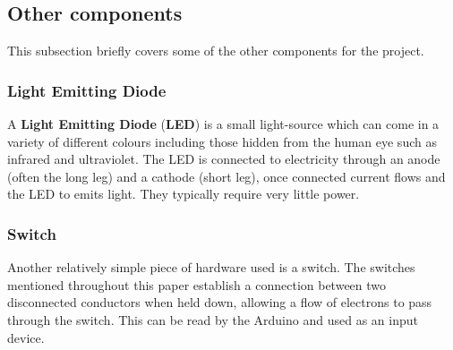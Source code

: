 \subsection{Other components}
This subsection briefly covers some of the other components for the project.
\subsubsection{Light Emitting Diode}
A \textbf{Light Emitting Diode} (\textbf{LED}) is a small light-source which can come in a variety of different colours including those hidden from the human eye such as infrared and ultraviolet.
The LED is connected to electricity through an anode (often the long leg) and a cathode (short leg), once connected current flows and the LED to emits light.
They typically require very little power.

\subsubsection{Switch}
Another relatively simple piece of hardware used is a switch.
The switches mentioned throughout this paper establish a connection between two disconnected conductors when held down, allowing a flow of electrons to pass through the switch.
This can be read by the Arduino and used as an input device. 